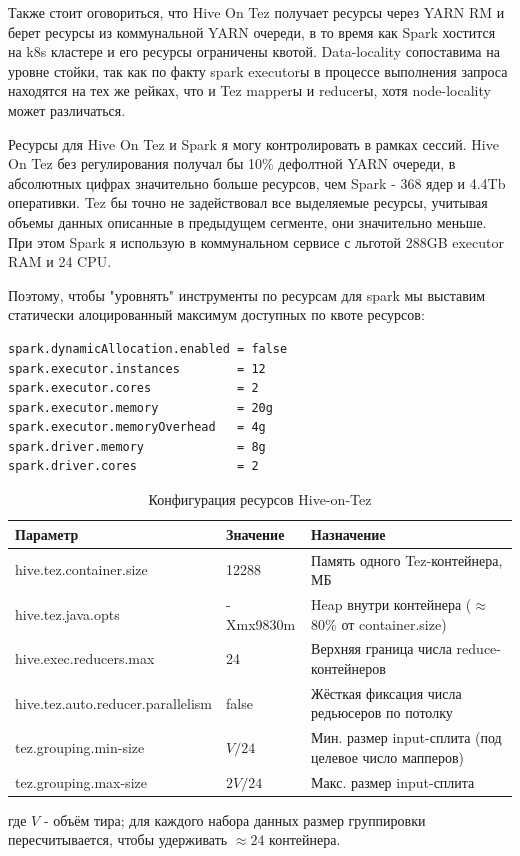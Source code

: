 \documentclass[12pt,letterpaper, onecolumn]{exam}
\begin{document}
Также стоит оговориться, что Hive On Tez получает ресурсы через YARN RM и берет ресурсы из коммунальной YARN очереди, в то время как Spark хостится на k8s кластере и его ресурсы ограничены квотой. Data-locality сопоставима на уровне стойки, так как по факту spark executorы в процессе выполнения запроса находятся на тех же рейках, что и Tez mapperы и reducerы, хотя node-locality может различаться. 

Ресурсы для Hive On Tez и Spark я могу контролировать в рамках сессий. Hive On Tez без регулирования получал бы 10\% дефолтной YARN очереди, в абсолютных цифрах значительно больше ресурсов, чем Spark - 368 ядер и 4.4Tb оперативки. Tez бы точно не задействовал все выделяемые ресурсы, учитывая объемы данных описанные в предыдущем сегменте, они значительно меньше. При этом Spark я использую в коммунальном сервисе с льготой 288GB executor RAM и 24 CPU.

Поэтому, чтобы "уровнять" инструменты по ресурсам для spark мы выставим статически алоцированный максимум доступных по квоте ресурсов:


\noindent
\begin{minipage}{\linewidth}
\begin{lstlisting}[style=sparkconf, caption={Конфигурация ресурсов Spark}, label={lst:spark-conf}]
spark.dynamicAllocation.enabled = false
spark.executor.instances        = 12
spark.executor.cores            = 2
spark.executor.memory           = 20g
spark.executor.memoryOverhead   = 4g
spark.driver.memory             = 8g
spark.driver.cores              = 2
\end{lstlisting}
\end{minipage}

\begin{table}[ht]
\centering
\caption{Конфигурация ресурсов Hive-on-Tez}
\label{tab:hive-conf}
\begin{tabular}{|l|l|p{6cm}|}
\hline
\textbf{Параметр} & \textbf{Значение} & \textbf{Назначение} \\
\hline
hive.tez.container.size & 12288 & Память одного Tez-контейнера, МБ \\
hive.tez.java.opts & -Xmx9830m & Heap внутри контейнера ($\approx$80\% от container.size) \\
hive.exec.reducers.max & 24 & Верхняя граница числа reduce-контейнеров \\
hive.tez.auto.reducer.parallelism & false & Жёсткая фиксация числа редьюсеров по потолку \\
tez.grouping.min-size & $V/24$ & Мин. размер input-сплита (под целевое число мапперов) \\
tez.grouping.max-size & $2V/24$ & Макс. размер input-сплита \\
\hline
\end{tabular}

\vspace{0.5em}
{\footnotesize где $V$ - объём тира; для каждого набора данных размер группировки пересчитывается, чтобы удерживать $\approx 24$ контейнера.}
\end{table}
\end{document}

